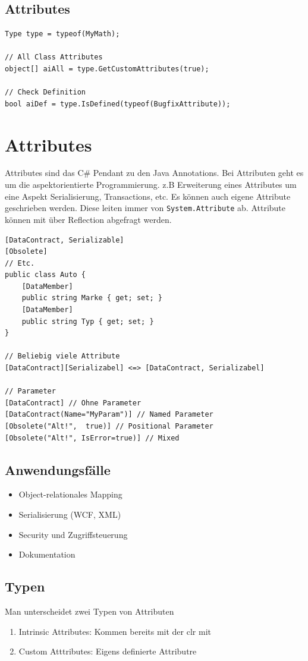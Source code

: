 \documentclass[
a4paper,
oneside,
10pt,
fleqn,
headsepline,
toc=listofnumbered, 
bibliography=totocnumbered]{scrartcl}
\let\stdsection\section
\renewcommand\section{\clearpage\stdsection}
\begin{document}
\subsection{Attributes}
\begin{lstlisting}[caption=Reflection: Attributes]
Type type = typeof(MyMath);

// All Class Attributes
object[] aiAll = type.GetCustomAttributes(true);

// Check Definition
bool aiDef = type.IsDefined(typeof(BugfixAttribute));
\end{lstlisting}

\section{Attributes}
Attributes sind das C\# Pendant zu den Java Annotations. Bei Attributen geht es um die aspektorientierte Programmierung. z.B Erweiterung eines Attributes um eine Aspekt Serialisierung, Transactions, etc. Es können auch eigene Attribute geschrieben werden. Diese leiten immer von \lstinline|System.Attribute| ab. Attribute können mit über Reflection abgefragt werden.
\begin{lstlisting}[caption=Attributes]
[DataContract, Serializable]
[Obsolete]
// Etc.
public class Auto {
	[DataMember]
	public string Marke { get; set; }
	[DataMember]
	public string Typ { get; set; }
}

// Beliebig viele Attribute
[DataContract][Serializabel] <=> [DataContract, Serializabel]

// Parameter
[DataContract] // Ohne Parameter
[DataContract(Name="MyParam")] // Named Parameter
[Obsolete("Alt!",  true)] // Positional Parameter
[Obsolete("Alt!", IsError=true)] // Mixed
\end{lstlisting}

\subsection{Anwendungsfälle}
\begin{itemize}
	\item Object-relationales Mapping
	\item Serialisierung (WCF, XML)
	\item Security und Zugriffsteuerung
	\item Dokumentation
\end{itemize}

\subsection{Typen}
Man unterscheidet zwei Typen von Attributen
\begin{enumerate}
	\item Intrinsic Attributes: Kommen bereits mit der \gls{clr} mit
	\item Custom Atttributes: Eigens definierte Attributre
\end{enumerate}
\end{document}
